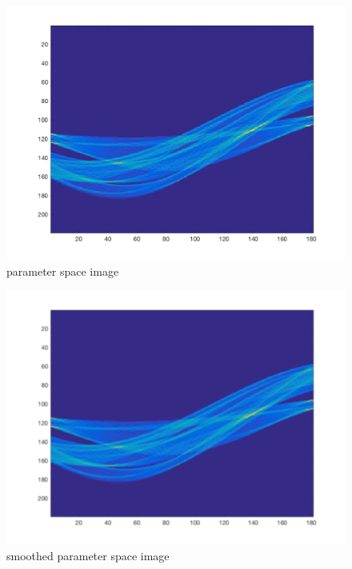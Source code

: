 \documentclass[paper=a4, fontsize=11pt]{scrartcl} %
\numberwithin{equation}{section} %
\numberwithin{figure}{section} %
\numberwithin{table}{section} %
\begin{document}
\begin{figure}[H]
  \centering
  \begin{minipage}[b]{0.9\textwidth}
    \includegraphics[width=\textwidth]{houghTransform_sc.png}
    \caption{parameter space image}
  \end{minipage}
\end{figure}

\begin{figure}[H]
  \centering
  \begin{minipage}[b]{0.9\textwidth}
    \includegraphics[width=\textwidth]{smoothed_image.png}
    \caption{smoothed parameter space image}
  \end{minipage}
\end{figure}
\end{document}
